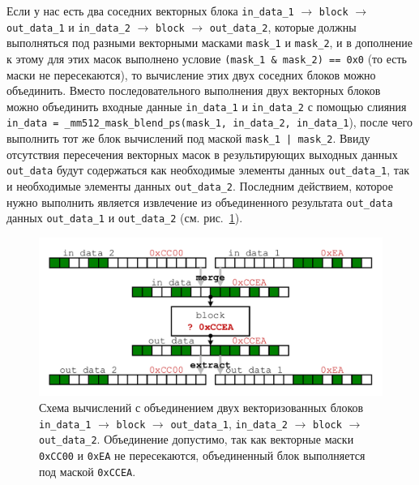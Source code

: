 Если у нас есть два соседних векторных блока \texttt{in\_data\_1} $\rightarrow$ \texttt{block} $\rightarrow$ \texttt{out\_data\_1} и \texttt{in\_data\_2} $\rightarrow$ \texttt{block} $\rightarrow$ \texttt{out\_data\_2}, которые должны выполняться под разными векторными масками \texttt{mask\_1} и \texttt{mask\_2}, и в дополнение к этому для этих масок выполнено условие \texttt{(mask\_1 \& mask\_2) == 0x0} (то есть маски не пересекаются), то вычисление этих двух соседних блоков можно объединить.
Вместо последовательного выполнения двух векторных блоков можно объединить входные данные \texttt{in\_data\_1} и \texttt{in\_data\_2} с помощью слияния \texttt{in\_data = \_mm512\_mask\_blend\_ps(mask\_1, in\_data\_2, in\_data\_1}), после чего выполнить тот же блок вычислений под маской \texttt{mask\_1 | mask\_2}.
Ввиду отсутствия пересечения векторных масок в результирующих выходных данных \texttt{out\_data} будут содержаться как необходимые элементы данных \texttt{out\_data\_1}, так и необходимые элементы данных \texttt{out\_data\_2}.
Последним действием, которое нужно выполнить является извлечение из объединенного результата \texttt{out\_data} данных \texttt{out\_data\_1} и \texttt{out\_data\_2} (см. рис.~\ref{fig:text_4_vec_comb_mask_comb_masks}).

\begin{figure}[ht]
\centering
\includegraphics[width=1.0\textwidth]{./pics/text_4_vec_comb_mask/comb_masks.pdf}
\singlespacing
{}\caption{Схема вычислений с объединением двух векторизованных блоков \texttt{in\_data\_1} $\rightarrow$ \texttt{block} $\rightarrow$ \texttt{out\_data\_1}, \texttt{in\_data\_2} $\rightarrow$ \texttt{block} $\rightarrow$ \texttt{out\_data\_2}. Объединение допустимо, так как векторные маски \texttt{0xCC00} и \texttt{0xEA} не пересекаются, объединенный блок выполняется под маской \texttt{0xCCEA}.}
\label{fig:text_4_vec_comb_mask_comb_masks}
\end{figure}

